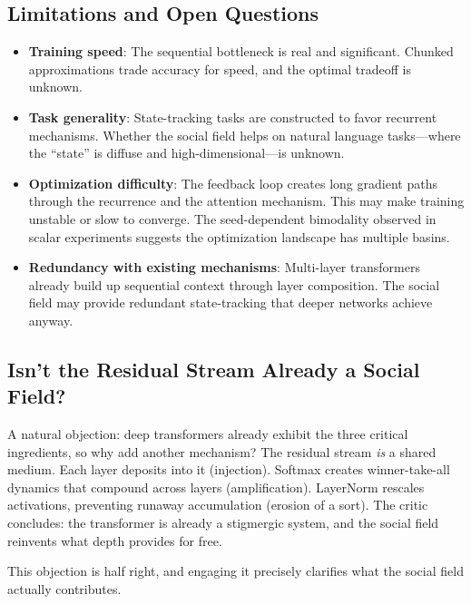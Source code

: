 \documentclass[11pt,a4paper]{article}
\begin{document}
\subsection{Limitations and Open Questions}

\begin{itemize}
    \item \textbf{Training speed}: The sequential bottleneck is real
          and significant.  Chunked approximations trade accuracy for
          speed, and the optimal tradeoff is unknown.
    \item \textbf{Task generality}: State-tracking tasks are
          constructed to favor recurrent mechanisms.  Whether the
          social field helps on natural language tasks---where the
          ``state'' is diffuse and high-dimensional---is unknown.
    \item \textbf{Optimization difficulty}: The feedback loop creates
          long gradient paths through the recurrence and the
          attention mechanism.  This may make training unstable or
          slow to converge.  The seed-dependent bimodality observed
          in scalar experiments suggests the optimization landscape
          has multiple basins.
    \item \textbf{Redundancy with existing mechanisms}: Multi-layer
          transformers already build up sequential context through
          layer composition.  The social field may provide redundant
          state-tracking that deeper networks achieve anyway.
\end{itemize}

\subsection{Isn't the Residual Stream Already a Social Field?}
\label{sec:already_social}

A natural objection: deep transformers already exhibit the three
critical ingredients, so why add another mechanism?  The residual
stream \emph{is} a shared medium.  Each layer deposits into it
(injection).  Softmax creates winner-take-all dynamics that compound
across layers (amplification).  LayerNorm rescales activations,
preventing runaway accumulation (erosion of a sort).  The critic
concludes: the transformer is already a stigmergic system, and the
social field reinvents what depth provides for free.

This objection is half right, and engaging it precisely clarifies what
the social field actually contributes.
\end{document}
